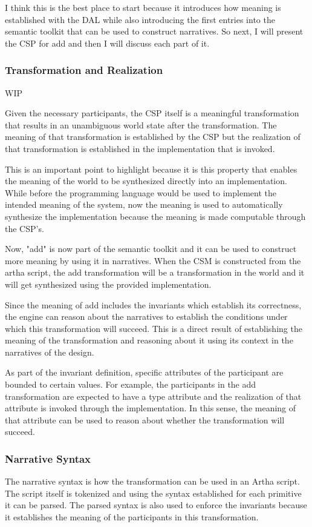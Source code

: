 
I think this is the best place to start because it introduces how meaning is established with the DAL while also introducing the first entries into the semantic toolkit that can be used to construct narratives. So next, I will present the CSP for add and then I will discuss each part of it.




\subsubsection{Transformation and Realization}

{\color{red}WIP}

Given the necessary participants, the CSP itself is a meaningful transformation that results in an unambiguous world state after the transformation. The meaning of that transformation is established by the CSP but the realization of that transformation is established in the implementation that is invoked. 

This is an important point to highlight because it is this property that enables the meaning of the world to be synthesized directly into an implementation. While before the programming language would be used to implement the intended meaning of the system, now the meaning is used to automatically synthesize the implementation because the meaning is made computable through the CSP's.

Now, "add" is now part of the semantic toolkit and it can be used to construct more meaning by using it in narratives. When the CSM is constructed from the artha script, the add transformation will be a transformation in the world and it will get synthesized using the provided implementation.

Since the meaning of add includes the invariants which establish its correctness, the engine can reason about the narratives to establish the conditions under which this transformation will succeed. This is a direct result of establishing the meaning of the transformation and reasoning about it using its context in the narratives of the design.

As part of the invariant definition, specific attributes of the participant are bounded to certain values. For example, the participants in the add transformation are expected to have a type attribute and the realization of that attribute is invoked through the implementation. In this sense, the meaning of that attribute can be used to reason about whether the transformation will succeed. 


\subsubsection{Narrative Syntax}

The narrative syntax is how the transformation can be used in an Artha script. The script itself is tokenized and using the syntax established for each primitive it can be parsed. The parsed syntax is also used to enforce the invariants because it establishes the meaning of the participants in this transformation.
